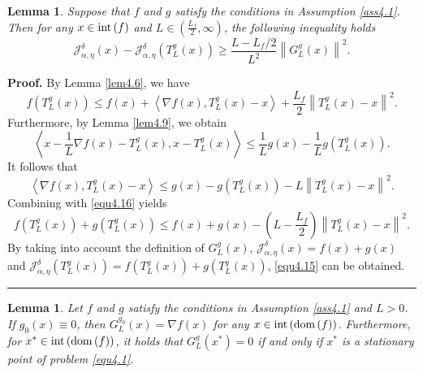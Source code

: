 \documentclass[a4paper,12pt]{article}
\newtheorem{lemma}[theorem]{Lemma}
\numberwithin{equation}{section}
\newenvironment{proof}[1][Proof]{\textbf{#1.} }
{\ \rule{0.75em}{0.75em}\smallskip}
\begin{document}
\begin{lemma}\label{lem4.10}
    Suppose that $f$ and $g$ satisfy the conditions in Assumption \ref{ass4.1}. Then for any $x\in {\rm int}\left(f\right)$ and $L\in \left(\frac{L_{f}}{2},\infty\right)$, the following inequality holds
    \begin{equation}\label{equ4.15}
        \mathcal{J}_{\alpha,\eta}^{\delta}\left(x\right)- \mathcal{J}_{\alpha,\eta}^{\delta}\left(T_{L}^{g}\left(x\right)\right) \geq \frac{L-L_{f}/2}{L^{2}}\left\|G_{L}^{g}\left(x\right)\right\|^{2}.
    \end{equation}
\end{lemma}

\begin{proof}
    By Lemma \ref{lem4.6}, we have
    \begin{equation}\label{equ4.16}
        f\left(T_{L}^{g}\left(x\right)\right)\leq f\left(x\right)+\left< \nabla f\left(x\right),T_{L}^{g}\left(x\right)-x\right>+ \frac{L_{f}}{2}\left\|T_{L}^{g}\left(x\right)-x\right\|^{2}.
    \end{equation}
    Furthermore, by Lemma \ref{lem4.9}, we obtain
    \begin{equation*}
        \left<x-\frac{1}{L}\nabla f\left(x\right)-T_{L}^{g}\left(x\right), x-T_{L}^{g}\left(x\right)\right>\leq \frac{1}{L}g\left(x\right)- \frac{1}{L}g\left(T_{L}^{g}\left(x\right)\right).
    \end{equation*}
    It follows that
    \begin{equation*}
        \left<\nabla f\left(x\right), T_{L}^{g}\left(x\right)-x\right>\leq g\left(x\right)-g\left(T_{L}^{g}\left(x\right)\right) -L\left\|T_{L}^{g}\left(x\right)-x\right\|^{2}.
    \end{equation*}
    Combining with \eqref{equ4.16} yields
    \begin{equation*}
        f\left(T_{L}^{g}\left(x\right)\right)+g\left(T_{L}^{g}\left(x\right)\right)\leq f\left(x\right)+g\left(x\right)- \left(L-\frac{L_{f}}{2}\right)\left\|T_{L}^{g}\left(x\right)-x\right\|^{2}.
    \end{equation*}
    By taking into account the definition of $G_{L}^{g}\left(x\right)$, $\mathcal{J}_{\alpha,\eta}^{\delta}\left(x\right)=f\left(x\right)+g\left(x\right)$ and $\mathcal{J}_{\alpha,\eta}^{\delta}\left(T_{L}^{g}\left(x\right)\right)= f\left(T_{L}^{g}\left(x\right)\right)+g\left(T_{L}^{g}\left(x\right)\right)$, \eqref{equ4.15} can be obtained.
\end{proof}

\begin{lemma}\label{lem4.11}
    Let $f$ and $g$ satisfy the conditions in Assumption \ref{ass4.1} and $L>0$. If $g_{0}\left(x\right)\equiv 0$, then $G_{L}^{g_{0}}\left(x\right)=\nabla f\left(x\right)$ for any $x\in {\rm int}\left({\rm dom}\left(f\right)\right)$. Furthermore, for $x^{*}\in {\rm int}\left({\rm dom}\left(f\right)\right)$, it holds that $G_{L}^{g}\left(x^{*}\right)=0$ if and only if $x^{*}$ is a stationary point of problem \eqref{equ4.1}.
\end{lemma}
\end{document}
